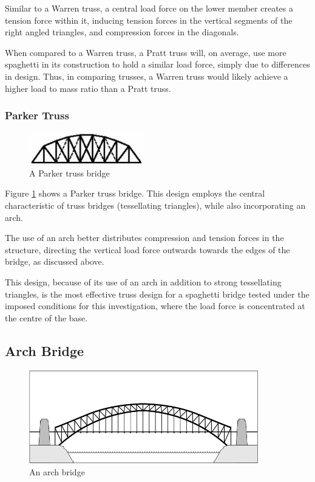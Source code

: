 \documentclass[a4paper,11pt]{article}
\begin{document}
Similar to a Warren truss, a central load force on the lower member creates a
tension force within it, inducing tension forces in the vertical segments of the
right angled triangles, and compression forces in the diagonals.

When compared to a Warren truss, a Pratt truss will, on average, use more
spaghetti in its construction to hold a similar load force, simply due to
differences in design.
Thus, in comparing trusses, a Warren truss would likely achieve a higher load to
mass ratio than a Pratt truss.


\subsubsection{Parker Truss}

\begin{figure}
\begin{center}
\includegraphics[width=5cm]{figures/parker.png}
\end{center}
\caption{A Parker truss bridge}
\label{research:parker}
\end{figure}

Figure \ref{research:parker} shows a Parker truss bridge.
This design employs the central characteristic of truss bridges (tessellating
triangles), while also incorporating an arch.

The use of an arch better distributes compression and tension forces in the
structure, directing the vertical load force outwards towards the edges of the
bridge, as discussed above.

This design, because of its use of an arch in addition to strong tessellating
triangles, is the most effective truss design for a spaghetti bridge tested
under the imposed conditions for this investigation, where the load force is
concentrated at the centre of the base.


\subsection{Arch Bridge}

\begin{figure}
\begin{center}
\includegraphics[width=10cm]{figures/arch-bridge.png}
\end{center}
\caption{An arch bridge}
\label{research:arch-bridge}
\end{figure}
\end{document}
